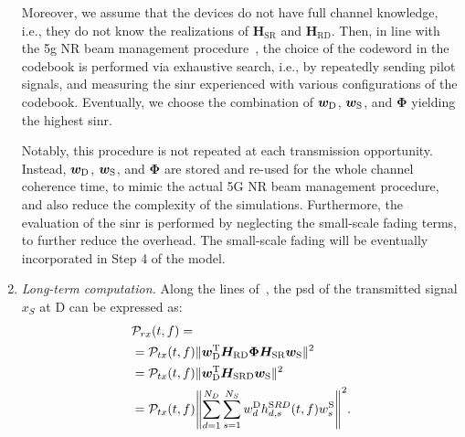 \begin{enumerate}
Moreover, we assume that the devices do not have full channel knowledge, i.e., they do not know the realizations of $\bm{H}_{\textrm {SR}}$ and $\bm{H}_{\textrm {RD}}$. 
Then, in line with the \gls{5g} NR beam management procedure~\cite{giordani2018tutorial}, the choice of the codeword in the codebook is performed via exhaustive search, i.e., by repeatedly sending pilot signals, and measuring the \gls{sinr} experienced with various configurations of the codebook. Eventually, we choose the combination of $\bm{w}_{\textrm D}$, $\bm{w}_{\textrm S}$, and $\bm{\Phi}$ yielding the highest \gls{sinr}.

Notably, this procedure is not repeated at each transmission opportunity. Instead, $\bm{w}_{\textrm D}$, $\bm{w}_{\textrm S}$, and $\bm{\Phi}$ are stored and re-used for the whole channel coherence time, to mimic the actual 5G NR beam management procedure, and also reduce the complexity of the simulations. 
Furthermore, the evaluation of the \gls{sinr} is performed by neglecting the small-scale fading terms, to further reduce the overhead. The small-scale fading will be eventually incorporated in Step 4 of the model.

\item \emph{Long-term computation.} 
Along the lines of~\cite{zugno2020implementation}, the \gls{psd} of the transmitted signal $x_S$ at D can be expressed as:
\begin{equation}
\begin{aligned}
&\mathcal{P}_{r x}(t, f) = \\
& = \mathcal{P}_{t x}(t, f) \lVert \bm{w}_{\textrm D}^{\textrm T} \bm{H}_{\textrm {RD}} \bm{\Phi} \bm{H}_{\textrm {SR}} \bm{w}_{\textrm S} \rVert^2 \\
&=\mathcal{P}_{t x}(t, f) \lVert \bm{w}_{\textrm D}^{\textrm T} \bm{H}_{\textrm {SRD}} \bm{w}_{\textrm S} \rVert^2 \\
& = \mathcal{P}_{t x}(t, f) \left\lVert \sum_{d=1}^{N_D} \sum_{s=1}^{N_S}  w^{\textrm D}_{d} h^{\mathrm SRD}_{d, s} (t, f)  w^{\textrm S}_{s} \right\rVert^2.
\end{aligned}
\label{eq:p-rx-sdr}
\end{equation}


\end{enumerate}
